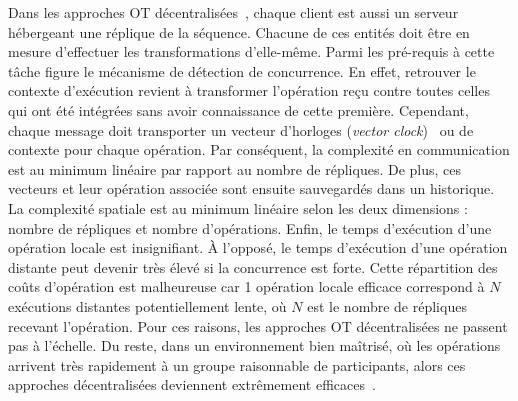 Dans les approches OT décentralisées~\cite{sun2009contextbased}, chaque client
est aussi un serveur hébergeant une réplique de la séquence. Chacune de ces
entités doit être en mesure d'effectuer les transformations d'elle-même. Parmi
les pré-requis à cette tâche figure le mécanisme de détection de concurrence. En
effet, retrouver le contexte d'exécution revient à transformer l'opération reçu
contre toutes celles qui ont été intégrées sans avoir connaissance de cette
première. Cependant, chaque message doit transporter un vecteur d'horloges
(\emph{vector clock})~\cite{lamport1978time} ou de contexte pour chaque
opération. Par conséquent, la complexité en communication est au minimum
linéaire par rapport au nombre de répliques. De plus, ces vecteurs et leur
opération associée sont ensuite sauvegardés dans un historique. La complexité
spatiale est au minimum linéaire selon les deux dimensions : nombre de répliques
et nombre d'opérations. Enfin, le temps d'exécution d'une opération locale est
insignifiant. À l'opposé, le temps d'exécution d'une opération distante peut
devenir très élevé si la concurrence est forte. Cette répartition des coûts
d'opération est malheureuse car 1 opération locale efficace correspond à $N$
exécutions distantes potentiellement lente, où $N$ est le nombre de répliques
recevant l'opération. Pour ces raisons, les approches OT décentralisées ne
passent pas à l'échelle. Du reste, dans un environnement bien maîtrisé, où les
opérations arrivent très rapidement à un groupe raisonnable de participants,
alors ces approches décentralisées deviennent extrêmement
efficaces~\cite{mehdi2014merging}.




